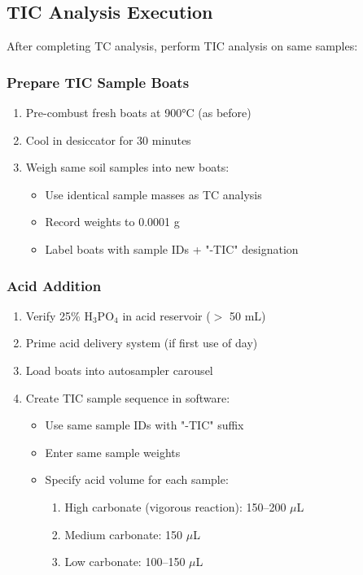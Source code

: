 \documentclass[11pt,a4paper]{article}\usepackage[]{graphicx}\usepackage[]{xcolor}
\begin{document}
\subsection{TIC Analysis Execution}

After completing TC analysis, perform TIC analysis on same samples:

\subsubsection{Prepare TIC Sample Boats}
\begin{enumerate}[noitemsep]
    \item Pre-combust fresh boats at 900°C (as before)
    \item Cool in desiccator for 30 minutes
    \item Weigh same soil samples into new boats:
    \begin{itemize}
        \item Use identical sample masses as TC analysis
        \item Record weights to 0.0001 g
        \item Label boats with sample IDs + "-TIC" designation
    \end{itemize}
\end{enumerate}

\subsubsection{Acid Addition}
\begin{enumerate}[noitemsep]
    \item Verify 25\% H$_3$PO$_4$ in acid reservoir ($>$ 50 mL)
    \item Prime acid delivery system (if first use of day)
    \item Load boats into autosampler carousel
    \item Create TIC sample sequence in software:
    \begin{itemize}
        \item Use same sample IDs with "-TIC" suffix
        \item Enter same sample weights
        \item Specify acid volume for each sample:
        \begin{enumerate}
            \item High carbonate (vigorous reaction): 150--200 $\mu$L
            \item Medium carbonate: 150 $\mu$L
            \item Low carbonate: 100--150 $\mu$L
        \end{enumerate}
    \end{itemize}
\end{enumerate}
\end{document}

